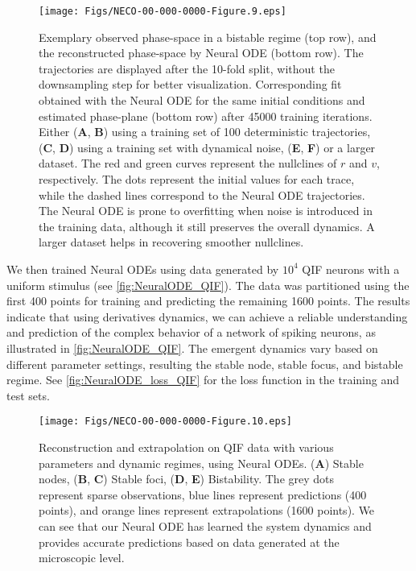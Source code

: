 \documentclass[12pt]{article}
\begin{document}
\begin{figure}
    \centering
    \texttt{[image: Figs/NECO-00-000-0000-Figure.9.eps]}
    \caption{Exemplary observed phase-space in a bistable regime (top row), and the reconstructed phase-space by Neural ODE (bottom row). The trajectories are displayed after the 10-fold split, without the downsampling step for better visualization. Corresponding fit obtained with the Neural ODE for the same initial conditions and estimated phase-plane (bottom row) after 45000 training iterations. Either (\textbf{A}, \textbf{B}) using a training set of 100 deterministic trajectories, (\textbf{C}, \textbf{D}) using a training set with dynamical noise, (\textbf{E},  \textbf{F}) or a larger dataset. The red and green curves represent the nullclines of $r$ and $v$, respectively. The dots represent the initial values for each trace, while the dashed lines correspond to the Neural ODE trajectories. The Neural ODE is prone to overfitting when noise is introduced in the training data, although it still preserves the overall dynamics. A larger dataset helps in recovering smoother nullclines.} 
    \label{fig:NeuralODE_montbrio}
\end{figure}

We then trained Neural ODEs using data generated by $10^4$ QIF neurons with a uniform stimulus (see \autoref{fig:NeuralODE_QIF}).
The data was partitioned using the first 400 points for training and predicting the remaining 1600 points. 
The results indicate that using derivatives dynamics, we can achieve a reliable understanding and prediction of the complex behavior of a network of spiking neurons, as illustrated in \autoref{fig:NeuralODE_QIF}. The emergent dynamics vary based on different parameter settings, resulting the stable node, stable focus, and bistable regime. See \autoref{fig:NeuralODE_loss_QIF} for the loss function in the training and test sets. 

\begin{figure}
    \centering
    \texttt{[image: Figs/NECO-00-000-0000-Figure.10.eps]}
    \caption{Reconstruction and extrapolation on QIF data with various parameters and dynamic regimes, using Neural ODEs. (\textbf{A}) Stable nodes, (\textbf{B}, \textbf{C}) Stable foci, (\textbf{D}, \textbf{E}) Bistability. The grey dots represent sparse  observations, blue lines represent predictions (400 points), and orange lines represent extrapolations (1600 points). We can see that our Neural ODE has learned the system dynamics and provides accurate predictions based on data generated at the microscopic level.} 
    \label{fig:NeuralODE_QIF}
\end{figure}
\end{document}
